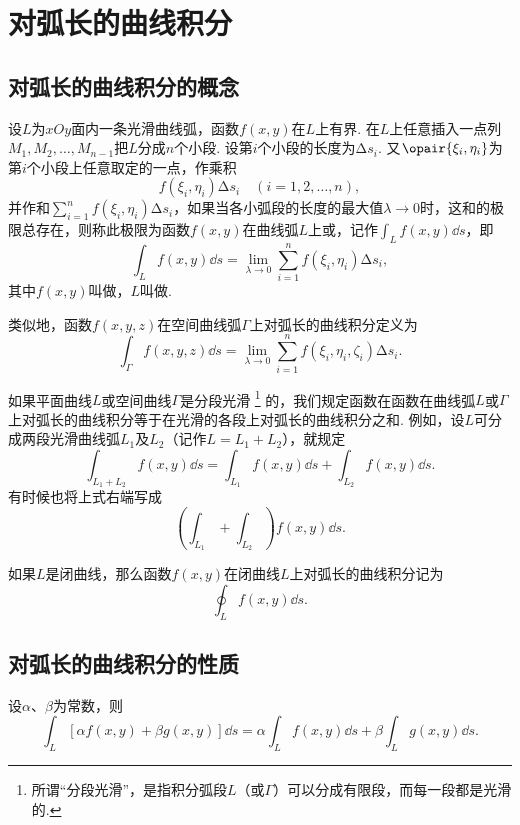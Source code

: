\section{对弧长的曲线积分}
\subsection{对弧长的曲线积分的概念}
\begin{definition}
设\(L\)为\(xOy\)面内一条光滑曲线弧，函数\(f(x,y)\)在\(L\)上有界.
在\(L\)上任意插入一点列\(M_1,M_2,\dotsc,M_{n-1}\)把\(L\)分成\(n\)个小段.
设第\(i\)个小段的长度为\(\increment s_i\).
又\(\opair{\xi_i,\eta_i}\)为第\(i\)个小段上任意取定的一点，作乘积\[
f(\xi_i,\eta_i) \increment s_i \quad(i=1,2,\dotsc,n),
\]并作和\(\sum_{i=1}^n f(\xi_i,\eta_i) \increment s_i\)，如果当各小弧段的长度的最大值\(\lambda\to0\)时，这和的极限总存在，则称此极限为函数\(f(x,y)\)在曲线弧\(L\)上或，记作\(\int_L f(x,y) \dd{s}\)，即\[
\int_L f(x,y) \dd{s}
= \lim_{\lambda\to0} \sum_{i=1}^n f(\xi_i,\eta_i) \increment s_i,
\]其中\(f(x,y)\)叫做，\(L\)叫做.

类似地，函数\(f(x,y,z)\)在空间曲线弧\(\Gamma\)上对弧长的曲线积分定义为\[
\int_\Gamma f(x,y,z) \dd{s}
=\lim_{\lambda\to0} \sum_{i=1}^n f(\xi_i,\eta_i,\zeta_i) \increment s_i.
\]

如果平面曲线\(L\)或空间曲线\(\Gamma\)是分段光滑%
\footnote{%
所谓“分段光滑”，是指积分弧段\(L\)（或\(\Gamma\)）可以分成有限段，而每一段都是光滑的.%
}%
的，我们规定函数在函数在曲线弧\(L\)或\(\Gamma\)上对弧长的曲线积分等于在光滑的各段上对弧长的曲线积分之和.
例如，设\(L\)可分成两段光滑曲线弧\(L_1\)及\(L_2\)（记作\(L=L_1+L_2\)），就规定
\[
\int_{L_1+L_2} f(x,y) \dd{s}
= \int_{L_1} f(x,y) \dd{s}
+ \int_{L_2} f(x,y) \dd{s}.
\]
有时候也将上式右端写成\[
\left( \int_{L_1} + \int_{L_2} \right) f(x,y) \dd{s}.
\]

如果\(L\)是闭曲线，那么函数\(f(x,y)\)在闭曲线\(L\)上对弧长的曲线积分记为\[
\oint_L f(x,y) \dd{s}.
\]
\end{definition}

\subsection{对弧长的曲线积分的性质}
\begin{property}\label{theorem:线积分与面积分.第一类曲线积分性质1}
设\(\alpha\)、\(\beta\)为常数，则\[
\int_L [\alpha f(x,y) + \beta g(x,y)] \dd{s}
= \alpha \int_L f(x,y) \dd{s}
+ \beta \int_L g(x,y) \dd{s}.
\]
\end{property}

